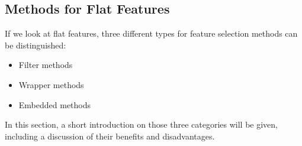 \subsection{Methods for Flat Features}
\label{sec:methods.flat}


If we look at flat features, three different types for feature
selection methods can be distinguished:

\begin{itemize}
  \item Filter methods
  \item Wrapper methods
  \item Embedded methods
\end{itemize}

In this section, a short introduction on those three categories will be given, 
including a discussion of their benefits and disadvantages.



